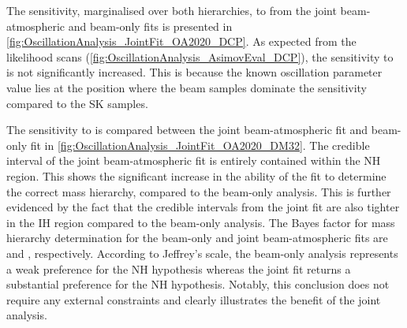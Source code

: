 The sensitivity, marginalised over both hierarchies, to  from the joint beam-atmospheric and beam-only fits is presented in \autoref{fig:OscillationAnalysis_JointFit_OA2020_DCP}. As expected from the likelihood scans (\autoref{fig:OscillationAnalysis_AsimovEval_DCP}), the sensitivity to  is not significantly increased. This is because the known oscillation parameter value lies at the position where the beam samples dominate the sensitivity compared to the SK samples.

The sensitivity to  is compared between the joint beam-atmospheric fit and beam-only fit in \autoref{fig:OscillationAnalysis_JointFit_OA2020_DM32}. The \quickmath{1\sigma} credible interval of the joint beam-atmospheric fit is entirely contained within the NH region. This shows the significant increase in the ability of the fit to determine the correct mass hierarchy, compared to the beam-only analysis. This is further evidenced by the fact that the  credible intervals from the joint fit are also tighter in the IH region compared to the beam-only analysis. The Bayes factor for mass hierarchy determination for the beam-only and joint beam-atmospheric fits are  and , respectively. According to Jeffrey's scale, the beam-only analysis represents a weak preference for the NH hypothesis whereas the joint fit returns a substantial preference for the NH hypothesis. Notably, this conclusion does not require any external constraints and clearly illustrates the benefit of the joint analysis.

